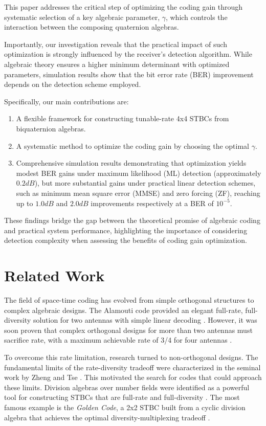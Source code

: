 \documentclass[twocolumn,conference]{IEEEtran}
\begin{document}
This paper addresses the critical step of optimizing the coding gain through systematic selection of a key algebraic parameter, \(\gamma\), which controls the interaction between the composing quaternion algebras.

Importantly, our investigation reveals that the practical impact of such optimization is strongly influenced by the receiver's detection algorithm. 
While algebraic theory ensures a higher minimum determinant with optimized parameters, simulation results show that the bit error rate (BER) improvement depends on the detection scheme employed.

Specifically, our main contributions are:
\begin{enumerate}
    \item A flexible framework for constructing tunable-rate 4x4 STBCs from biquaternion algebras.
    \item A systematic method to optimize the coding gain by choosing the optimal \(\gamma\).
    \item Comprehensive simulation results demonstrating that optimization yields modest BER gains under maximum likelihood (ML) detection (approximately $0.2 dB$), but more substantial gains under practical linear detection schemes, such as minimum mean square error (MMSE) and zero forcing (ZF), reaching up to $1.0 dB$ and $2.0 dB$ improvements respectively at a BER of \(10^{-5}\).
\end{enumerate}

These findings bridge the gap between the theoretical promise of algebraic coding and practical system performance, highlighting the importance of considering detection complexity when assessing the benefits of coding gain optimization.


\section{Related Work}

The field of space-time coding has evolved from simple orthogonal structures to complex algebraic designs. 
The Alamouti code provided an elegant full-rate, full-diversity solution for two antennas with simple linear decoding \cite{5}. 
However, it was soon proven that complex orthogonal designs for more than two antennas must sacrifice rate, with a maximum achievable rate of 3/4 for four antennas \cite{1}.

To overcome this rate limitation, research turned to non-orthogonal designs. 
The fundamental limits of the rate-diversity tradeoff were characterized in the seminal work by Zheng and Tse \cite{2}. 
This motivated the search for codes that could approach these limits. 
Division algebras over number fields were identified as a powerful tool for constructing STBCs that are full-rate and full-diversity \cite{3}. 
The most famous example is the \emph{Golden Code}, a 2x2 STBC built from a cyclic division algebra that achieves the optimal diversity-multiplexing tradeoff \cite{6}.
\end{document}
